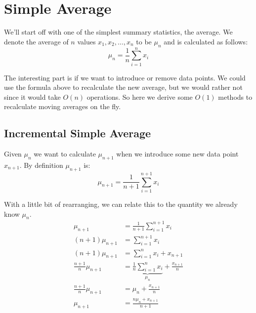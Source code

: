\documentclass[english,12pt]{article}
\theoremstyle{plain}
\theoremstyle{definition}
\theoremstyle{definition} %
\begin{document}
\begin{titlepage}
\vfill %

\end{titlepage}

\tableofcontents %

\newpage
\section{Simple Average}
We'll start off with one of the simplest summary statistics, the average.  We denote the average of $n$ values $x_1, x_2,\ldots, x_n$ to be $\mu_n$ and is calculated as follows:
\[\mu_n=\frac{1}{n}\sum_{i=1}^n x_i\]

The interesting part is if we want to introduce or remove data points.  We could use the formula above to recalculate the new average, but we would rather not since it would take $O(n)$ operations.  So here we derive some $O(1)$ methods to recalculate moving averages on the fly.

\subsection{Incremental Simple Average}
Given $\mu_n$ we want to calculate $\mu_{n+1}$ when we introduce some new data point $x_{n+1}$.  By definition $\mu_{n+1}$ is:
\[\mu_{n+1}=\frac{1}{n+1}\sum_{i=1}^{n+1} x_i\]

With a little bit of rearranging, we can relate this to the quantity we already know $\mu_n$.
\begin{align*}
\mu_{n+1}&=\frac{1}{n+1}\sum_{i=1}^{n+1} x_i\\
(n+1)\mu_{n+1}&=\sum_{i=1}^{n+1} x_i\\
(n+1)\mu_{n+1}&=\sum_{i=1}^{n} x_i + x_{n+1}\\
\frac{n+1}{n}\mu_{n+1}&=\underbrace{\frac{1}{n}\sum_{i=1}^nx_i}_{\mu_n}+\frac{x_{n+1}}{n}\\
\frac{n+1}{n}\mu_{n+1}&=\mu_n+\frac{x_{n+1}}{n}\\
\mu_{n+1} &= \frac{n\mu_n+x_{n+1}}{n+1}
\end{align*}
\end{document}
